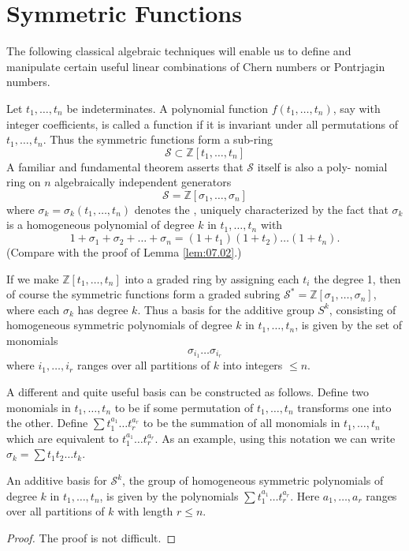 \documentclass[../main]{subfiles}
\begin{document}
\section{Symmetric Functions}
The following classical algebraic techniques will enable us to define and manipulate certain useful linear combinations of Chern numbers or Pontrjagin numbers.

Let $t_{1}, \ldots, t_{n}$ be indeterminates. A polynomial function $f(t_{1}, \ldots, t_{n})$, say with integer coefficients, is called a  function if it is invariant under all permutations of $t_{1}, \ldots, t_{n}$. Thus the symmetric functions form a sub-ring
\[
\mathcal{S} \subset \mathbb{Z}[t_{1}, \ldots, t_{n}]
\]
A familiar and fundamental theorem asserts that $\mathcal{S}$ itself is also a poly- nomial ring on $n$ algebraically independent generators
\[
\mathcal{S}=\mathbb{Z}[\sigma_{1}, \ldots, \sigma_{n}]
\]
where $\sigma_{k}=\sigma_{k}(t_{1}, \ldots, t_{n})$ denotes the , uniquely characterized by the fact that $\sigma_{k}$ is a homogeneous polynomial of degree $k$ in $t_{1}, \ldots, t_{n}$ with
\[
1+\sigma_{1}+\sigma_{2}+\ldots+\sigma_{n}=(1+t_{1})(1+t_{2}) \ldots(1+t_{n}).
\]
(Compare with the proof of Lemma \ref{lem:07.02}.)

If we make $\mathbb{Z}[t_{1}, \ldots, t_{n}]$ into a graded ring by assigning each $t_{i}$ the degree 1, then of course the symmetric functions form a graded subring $\mathcal{S}^{*}=\mathbb{Z}[\sigma_{1}, \ldots, \sigma_{n}]$, where each $\sigma_{k}$ has degree $k$. Thus a basis for the additive group $S^{k}$, consisting of homogeneous symmetric polynomials of degree $k$ in $t_{1}, \ldots, t_{n}$, is given by the set of monomials
\[
\sigma_{i_{1}} \ldots \sigma_{i_{r}}
\]
where $i_{1}, \ldots, i_{r}$ ranges over all partitions of $k$ into integers $\leq n$.

A different and quite useful basis can be constructed as follows. Define two monomials in $t_{1}, \ldots, t_{n}$ to be  if some permutation of $t_{1}, \ldots, t_{n}$ transforms one into the other. Define $\sum t_{1}^{a_{1}} \ldots t_{r}^{a_{r}}$ to be the summation of all monomials in $t_{1}, \ldots, t_{n}$ which are equivalent to $t_{1}^{a_{1}} \ldots t_{r}^{a_{r}}$. As an example, using this notation we can write $\sigma_{k}=\sum t_{1} t_{2} \ldots t_{k}$.

\begin{lemma}\label{lem:16.1}
An additive basis for $\mathcal{S}^{k}$, the group of homogeneous symmetric polynomials of degree $k$ in $t_{1}, \ldots, t_{n}$, is given by the polynomials $\sum t_1^{a_1}\dots t_r^{a_r}$. Here $a_{1}, \ldots, a_{r}$ ranges over all partitions of $k$ with length $r \leq n$.

\end{lemma} 
\begin{proof}
The proof is not difficult.
\end{proof}
\end{document}
